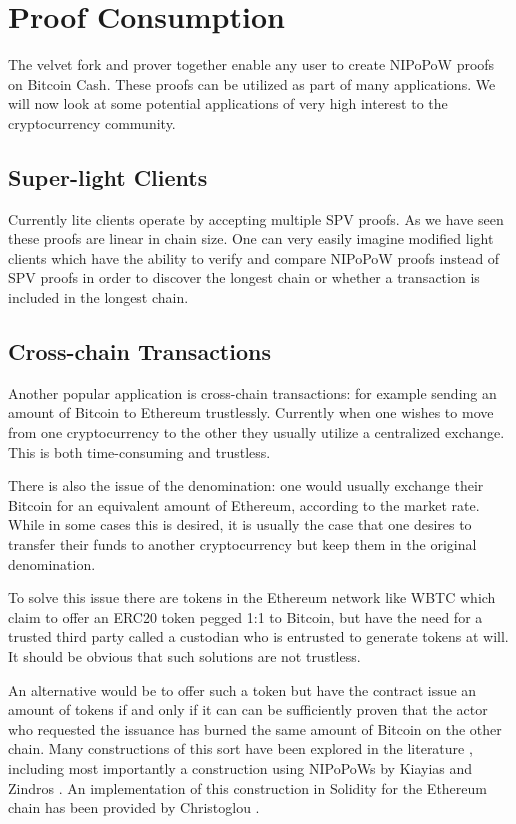 \section{Proof Consumption}
The velvet fork and prover together enable any user to create NIPoPoW proofs on Bitcoin Cash. These proofs can be utilized as part of many applications. We will now look at some potential applications of very high interest to the cryptocurrency community.

\subsection{Super-light Clients}
Currently lite clients operate by accepting multiple SPV proofs. As we have seen these proofs are linear in chain size. One can very easily imagine modified light clients which have the ability to verify and compare NIPoPoW proofs instead of SPV proofs in order to discover the longest chain or whether a transaction is included in the longest chain.

\subsection{Cross-chain Transactions}
Another popular application is cross-chain transactions: for example sending an amount of Bitcoin to Ethereum trustlessly. Currently when one wishes to move from one cryptocurrency to the other they usually utilize a centralized exchange. This is both time-consuming and trustless.

There is also the issue of the denomination: one would usually exchange their Bitcoin for an equivalent amount of Ethereum, according to the market rate. While in some cases this is desired, it is usually the case that one desires to transfer their funds to another cryptocurrency but keep them in the original denomination.

To solve this issue there are tokens in the Ethereum network like WBTC \cite{wbtc} which claim to offer an ERC20 token pegged 1:1 to Bitcoin, but have the need for a trusted third party called a custodian who is entrusted to generate tokens at will. It should be obvious that such solutions are not trustless.

An alternative would be to offer such a token but have the contract issue an amount of tokens if and only if it can can be sufficiently proven that the actor who requested the issuance has burned the same amount of Bitcoin on the other chain. Many constructions of this sort have been explored in the literature \cite{xclaim}, including most importantly a construction using NIPoPoWs by Kiayias and Zindros \cite{pow-sidechains}. An implementation of this construction in Solidity for the Ethereum chain has been provided by Christoglou \cite{christoglou}.


